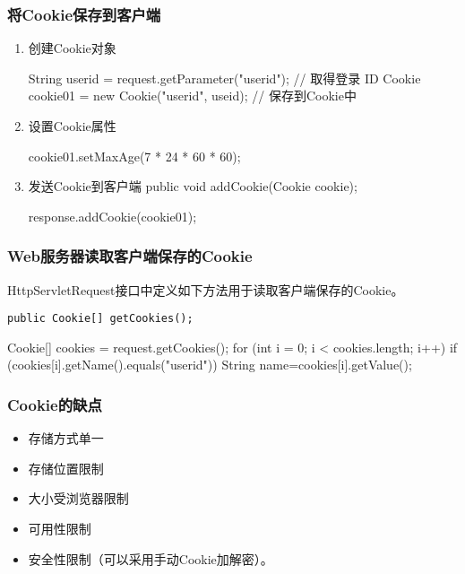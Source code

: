 \begin{frame}[fragile] %
\frametitle{将Cookie保存到客户端}
\begin{enumerate}
\item 创建Cookie对象
\begin{javaCode}
String userid = request.getParameter("userid"); // 取得登录 ID
Cookie cookie01 = new Cookie("userid", useid); // 保存到Cookie中
\end{javaCode}

\item 设置Cookie属性
\begin{javaCode}
cookie01.setMaxAge(7 * 24 * 60 * 60);    
\end{javaCode}

\item 发送Cookie到客户端 public void addCookie(Cookie cookie);
\begin{javaCode}
response.addCookie(cookie01);    
\end{javaCode}
\end{enumerate}
\end{frame}

\begin{frame} %
\frametitle{Web服务器读取客户端保存的Cookie}

HttpServletRequest接口中定义如下方法用于读取客户端保存的Cookie。
\begin{verbatim}
public Cookie[] getCookies();
\end{verbatim}

\begin{javaCode}
Cookie[] cookies = request.getCookies();
for (int i = 0; i < cookies.length; i++) {
  if (cookies[i].getName().equals("userid")) {
    String name=cookies[i].getValue();
  }
}
\end{javaCode}
\end{frame}

\begin{frame}[fragile] %
\frametitle{Cookie的缺点}

\begin{itemize}\kai
\item 存储方式单一
\item 存储位置限制
\item 大小受浏览器限制
\item 可用性限制
\item 安全性限制（可以采用手动Cookie加解密）。
\end{itemize}

\end{frame}

